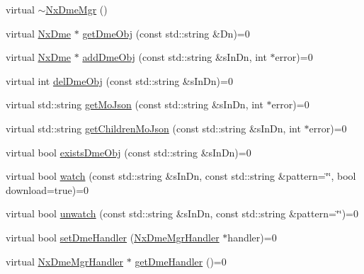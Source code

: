 \begin{DoxyCompactItemize}
\item 
virtual \mbox{\hyperlink{classnxos_1_1_nx_dme_mgr_a8e64bc40ea7fc589711b5abf3fbd76d7}{$\sim$\+Nx\+Dme\+Mgr}} ()
\item 
virtual \mbox{\hyperlink{classnxos_1_1_nx_dme}{Nx\+Dme}} $\ast$ \mbox{\hyperlink{classnxos_1_1_nx_dme_mgr_a15e7bdf416b3e17005327e556ad954e8}{get\+Dme\+Obj}} (const std\+::string \&Dn)=0
\item 
virtual \mbox{\hyperlink{classnxos_1_1_nx_dme}{Nx\+Dme}} $\ast$ \mbox{\hyperlink{classnxos_1_1_nx_dme_mgr_a9bbf25e6b6565bfef6f81e5d74ba4a9d}{add\+Dme\+Obj}} (const std\+::string \&s\+In\+Dn, int $\ast$error)=0
\item 
virtual int \mbox{\hyperlink{classnxos_1_1_nx_dme_mgr_ae29687ce5a8ac402e1297bb3c8528936}{del\+Dme\+Obj}} (const std\+::string \&s\+In\+Dn)=0
\item 
virtual std\+::string \mbox{\hyperlink{classnxos_1_1_nx_dme_mgr_af0c1e7578c6752294cade91b395ef19c}{get\+Mo\+Json}} (const std\+::string \&s\+In\+Dn, int $\ast$error)=0
\item 
virtual std\+::string \mbox{\hyperlink{classnxos_1_1_nx_dme_mgr_a950c598125c2cc0d739c4a882a65f447}{get\+Children\+Mo\+Json}} (const std\+::string \&s\+In\+Dn, int $\ast$error)=0
\item 
virtual bool \mbox{\hyperlink{classnxos_1_1_nx_dme_mgr_aa21c3fd72667ddbafb2b288e15c89a92}{exists\+Dme\+Obj}} (const std\+::string \&s\+In\+Dn)=0
\item 
virtual bool \mbox{\hyperlink{classnxos_1_1_nx_dme_mgr_a84b7abe8172478474ba83a403be390ae}{watch}} (const std\+::string \&s\+In\+Dn, const std\+::string \&pattern=\char`\"{}\char`\"{}, bool download=true)=0
\item 
virtual bool \mbox{\hyperlink{classnxos_1_1_nx_dme_mgr_a96f2b81fd3c248cb1408c95330ae6962}{unwatch}} (const std\+::string \&s\+In\+Dn, const std\+::string \&pattern=\char`\"{}\char`\"{})=0
\item 
virtual bool \mbox{\hyperlink{classnxos_1_1_nx_dme_mgr_a3d7e9ce8c28586d834f1504856e22988}{set\+Dme\+Handler}} (\mbox{\hyperlink{classnxos_1_1_nx_dme_mgr_handler}{Nx\+Dme\+Mgr\+Handler}} $\ast$handler)=0
\item 
virtual \mbox{\hyperlink{classnxos_1_1_nx_dme_mgr_handler}{Nx\+Dme\+Mgr\+Handler}} $\ast$ \mbox{\hyperlink{classnxos_1_1_nx_dme_mgr_a4eb84500ef136c111650e385c8f29eb6}{get\+Dme\+Handler}} ()=0
\end{DoxyCompactItemize}



